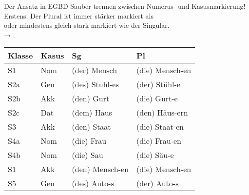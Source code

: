 \begin{frame}
  {Der Ansatz in EGBD}
  \large \alert{Sauber trennen zwischen Numerus- und Kasusmarkierung!}\\
  \pause
  \Halbzeile
  \normalsize
  Erstens: \alert{Der Plural ist immer stärker markiert als\\
  oder mindestens gleich stark markiert wie der Singular.}\\
  → .
  \pause
  \Zeile
  \begin{center}
    \begin{tabular}{llll}
      \toprule
      \textbf{Klasse} & \textbf{Kasus} & \textbf{Sg} & \textbf{Pl} \\
      \midrule
      S1 & Nom & (der) Mensch & (die) Mensch-en \\
      S2a & Gen & (des) Stuhl-es & (der) Stühl-e \\
      S2b & Akk & (den) Gurt & (die) Gurt-e \\
      S2c & Dat & (dem) Haus & (den) Häus-ern \\
      S3 & Akk & (den) Staat & (die) Staat-en \\
      S4a & Nom & (die) Frau & (die) Frau-en \\
      S4b & Nom & (die) Sau & (die) Säu-e \\
      \midrule
      S1 & Akk & (den) Mensch-en & (die) Mensch-en \\
      S5 & Gen & (des) Auto-s & (der) Auto-s \\
      \bottomrule
    \end{tabular}  
  \end{center}
\end{frame}


